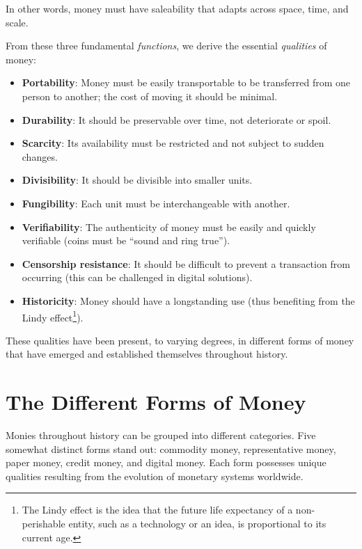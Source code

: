 \documentclass[
  a5paper,
  smalldemyvopaper,10pt,twoside,onecolumn,openright,extrafontsizes,hidelinks]{memoir}
\providecommand{\tightlist}{%
  \setlength{\itemsep}{0pt}\setlength{\parskip}{0pt}}\usepackage{longtable,booktabs,array}
\begin{document}
In other words, money must have saleability that adapts across space,
time, and scale.

From these three fundamental \emph{functions}, we derive the essential
\emph{qualities} of money:

\begin{itemize}
\tightlist
\item
  \textbf{Portability}: Money must be easily transportable to be
  transferred from one person to another; the cost of moving it should
  be minimal.
\item
  \textbf{Durability}: It should be preservable over time, not
  deteriorate or spoil.
\item
  \textbf{Scarcity}: Its availability must be restricted and not subject
  to sudden changes.
\item
  \textbf{Divisibility}: It should be divisible into smaller units.
\item
  \textbf{Fungibility}: Each unit must be interchangeable with another.
\item
  \textbf{Verifiability}: The authenticity of money must be easily and
  quickly verifiable (coins must be ``sound and ring true'').
\item
  \textbf{Censorship resistance}: It should be difficult to prevent a
  transaction from occurring (this can be challenged in digital
  solutions).
\item
  \textbf{Historicity}: Money should have a longstanding use (thus
  benefiting from the Lindy effect\footnote{The Lindy effect is the idea
    that the future life expectancy of a non-perishable entity, such as
    a technology or an idea, is proportional to its current age.}).
\end{itemize}

These qualities have been present, to varying degrees, in different
forms of money that have emerged and established themselves throughout
history.

\section*{The Different Forms of Money}\label{les-differentes-monnaies}


Monies throughout history can be grouped into different categories. Five
somewhat distinct forms stand out: commodity money, representative
money, paper money, credit money, and digital money. Each form possesses
unique qualities resulting from the evolution of monetary systems
worldwide.
\end{document}
